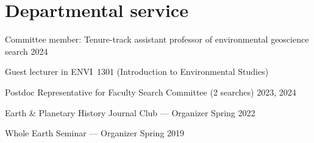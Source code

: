 \section{Departmental service}


Committee member: Tenure-track assistant professor of environmental geoscience search \hfill 2024

Guest lecturer in ENVI~1301 (Introduction to Environmental Studies)


Postdoc Representative for Faculty Search Committee (2 searches) \hfill 2023, 2024

Earth \& Planetary History Journal Club --- Organizer 	 \hfill	Spring 2022

Whole Earth Seminar --- Organizer \hfill  Spring 2019